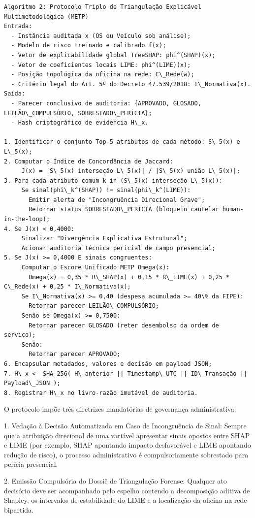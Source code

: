 \documentclass[10pt,a4paper,journal]{article}
\begin{document}
\begin{verbatim}
Algoritmo 2: Protocolo Triplo de Triangulação Explicável Multimetodológica (METP)
Entrada:
  - Instância auditada x (OS ou Veículo sob análise);
  - Modelo de risco treinado e calibrado f(x);
  - Vetor de explicabilidade global TreeSHAP: phi^(SHAP)(x);
  - Vetor de coeficientes locais LIME: phi^(LIME)(x);
  - Posição topológica da oficina na rede: C\_Rede(w);
  - Critério legal do Art. 5º do Decreto 47.539/2018: I\_Normativa(x).
Saída:
  - Parecer conclusivo de auditoria: {APROVADO, GLOSADO, LEILÃO\_COMPULSÓRIO, SOBRESTADO\_PERÍCIA};
  - Hash criptográfico de evidência H\_x.

1. Identificar o conjunto Top-5 atributos de cada método: S\_5(x) e L\_5(x);
2. Computar o Índice de Concordância de Jaccard:
     J(x) = |S\_5(x) interseção L\_5(x)| / |S\_5(x) união L\_5(x)|;
3. Para cada atributo comum k in (S\_5(x) interseção L\_5(x)):
     Se sinal(phi\_k^(SHAP)) != sinal(phi\_k^(LIME)):
       Emitir alerta de "Incongruência Direcional Grave";
       Retornar status SOBRESTADO\_PERÍCIA (bloqueio cautelar human-in-the-loop);
4. Se J(x) < 0,4000:
     Sinalizar "Divergência Explicativa Estrutural";
     Acionar auditoria técnica pericial de campo presencial;
5. Se J(x) >= 0,4000 E sinais congruentes:
     Computar o Escore Unificado METP Omega(x):
       Omega(x) = 0,35 * R\_SHAP(x) + 0,15 * R\_LIME(x) + 0,25 * C\_Rede(x) + 0,25 * I\_Normativa(x);
     Se I\_Normativa(x) >= 0,40 (despesa acumulada >= 40\% da FIPE):
       Retornar parecer LEILÃO\_COMPULSÓRIO;
     Senão se Omega(x) >= 0,7500:
       Retornar parecer GLOSADO (reter desembolso da ordem de serviço);
     Senão:
       Retornar parecer APROVADO;
6. Encapsular metadados, valores e decisão em payload JSON;
7. H\_x <- SHA-256( H\_anterior || Timestamp\_UTC || ID\_Transação || Payload\_JSON );
8. Registrar H\_x no livro-razão imutável de auditoria.
\end{verbatim}
O protocolo impõe três diretrizes mandatórias de governança administrativa:

1. Vedação à Decisão Automatizada em Caso de Incongruência de Sinal: Sempre que a atribuição direcional de uma variável apresentar sinais opostos entre SHAP e LIME (por exemplo, SHAP apontando impacto desfavorável e LIME apontando redução de risco), o processo administrativo é compulsoriamente sobrestado para perícia presencial.

2. Emissão Compulsória do Dossiê de Triangulação Forense: Qualquer ato decisório deve ser acompanhado pelo espelho contendo a decomposição aditiva de Shapley, os intervalos de estabilidade do LIME e a localização da oficina na rede bipartida.
\end{document}
